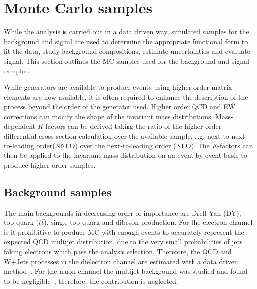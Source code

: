 \clearpage

\section{Monte Carlo samples}\label{sec:datamc:mc}
While the analysis is carried out in a data driven way, simulated samples for the background and signal are used to determine the appropriate functional form to fit the data, study background compositions, estimate uncertainties and evaluate signal. This section outlines the MC samples used for the background and signal samples.

While generators are available to produce events using higher order matrix elements are now available, it is often required to enhance the description of the process beyond the order of the generator used. Higher order QCD and EW corrections can modify the shape of the invariant mass distributions. Mass-dependent \emph{K}-factors can be derived taking the ratio of the higher order differential cross-section calculation over the available sample, e.g. next-to-next-to-leading order(NNLO) over the next-to-leading order (NLO). The \emph{K}-factors can then be applied to the invariant mass distribution on an event by event basis to produce higher order samples. 

\subsection{Background samples}\label{sec:datamc:mc:bkg}
The main backgrounds in decreasing order of importance are Drell-Yan (DY), top-quark ($t\bar{t}$), single-top-quark and diboson production. For the electron channel is it prohibitive to produce MC with enough events to accurately represent the expected QCD multijet distribution, due to the very small probabilities of jets faking electrons which pass the analysis selection. Therefore, the QCD and W+Jets processes in the dielectron channel are estimated with a data driven method~\cite{EXOT-2016-05}. For the muon channel the multijet background was studied and found to be negligible~\cite{EXOT-2016-05}, therefore, the contribution is neglected. 

